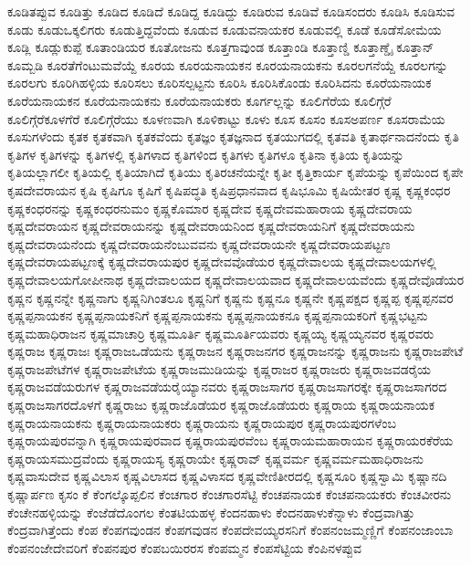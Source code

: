 {ಕೂಡಿತಪ್ಪುವ
ಕೂಡಿತ್ತು
ಕೂಡಿದ
ಕೂಡಿದೆ
ಕೂಡಿದ್ದ
ಕೂಡಿದ್ದು
ಕೂಡಿರುವ
ಕೂಡಿವೆ
ಕೂಡಿಸಂದರು
ಕೂಡಿಸಿ
ಕೂಡಿಸುವ
ಕೂಡು
ಕೂಡುಒಕ್ಕಲಿಗರು
ಕೂಡುತ್ತಿದ್ದವೆಂದು
ಕೂಡುವ
ಕೂಡುವನಾಯಕರ
ಕೂಡುವಲ್ಲಿ
ಕೂಡೆ
ಕೂಡೆಸೋಮೆಯ
ಕೂಡ್ಲಿ
ಕೂಡ್ಲುಕುಪ್ಪೆ
ಕೂತಾಂಡಿಯರ
ಕೂತೋಜನು
ಕೂತ್ತಗಾವುಂಡ
ಕೂತ್ತಾಂಡಿ
ಕೂತ್ತಾಣ್ಡಿ
ಕೂತ್ತಾಣ್ಡೈ
ಕೂತ್ತಾನ್
ಕೂಮ್ಬಡಿ
ಕೂರತೆಗೆಂಟುಮವೆಯ್ದೆ
ಕೂರಯ
ಕೂರಯನಾಯಕನ
ಕೂರಯನಾಯಕನು
ಕೂರಲಗನೆಯ್ದೆ
ಕೂರಲಗನ್ನು
ಕೂರಲಗು
ಕೂರಿಗಿಹಳ್ಳಿಯ
ಕೂರಿಸಲು
ಕೂರಿಸಲ್ಪಟ್ಟನು
ಕೂರಿಸಿ
ಕೂರಿಸಿಕೊಂಡು
ಕೂರಿಸಿದನು
ಕೂರೆಯನಾಯಕ
ಕೂರೆಯನಾಯಕನ
ಕೂರೆಯನಾಯಕನು
ಕೂರೆಯನಾಯಕರು
ಕೂರ್ಗಲ್ಲನ್ನು
ಕೂಲಿಗೆರೆಯ
ಕೂಲಿಗ್ಗೆರೆ
ಕೂಲಿಗ್ಗೆರೆಕೂಳಗೆರೆ
ಕೂಲಿಗ್ಗೆರೆಯು
ಕೂಳಣವಾಗಿ
ಕೂಳಿಕಾಟ್ಟು
ಕೂಳು
ಕೂಸ
ಕೂಸಂ
ಕೂಸಅಪರ್ಣ
ಕೂಸರಾಮೆಯ
ಕೂಸುಗಳೆಂದು
ಕೃತಕ
ಕೃತಕವಾಗಿ
ಕೃತಕವೆಂದು
ಕೃತಜ್ಞಂ
ಕೃತಜ್ಞನಾದ
ಕೃತಯುಗದಲ್ಲಿ
ಕೃತವತಿ
ಕೃತಾರ್ಥನಾದನೆಂದು
ಕೃತಿ
ಕೃತಿಗಳ
ಕೃತಿಗಳನ್ನು
ಕೃತಿಗಳಲ್ಲಿ
ಕೃತಿಗಳಾದ
ಕೃತಿಗಳಿಂದ
ಕೃತಿಗಳು
ಕೃತಿಗಳೂ
ಕೃತಿನಾ
ಕೃತಿಯ
ಕೃತಿಯನ್ನು
ಕೃತಿಯಲ್ಲಾಗಲೀ
ಕೃತಿಯಲ್ಲಿ
ಕೃತಿಯಾಗಿದೆ
ಕೃತಿಯು
ಕೃತಿರಚನೆಯನ್ನೇ
ಕೃತೀ
ಕೃತ್ತಿಕಾರ್ಯ
ಕೃಪೆಯನ್ನು
ಕೃಪೆಯಿಂದ
ಕೃಪೇ
ಕೃಷದೇವರಾಯನ
ಕೃಷಿ
ಕೃಷಿಗೂ
ಕೃಷಿಗೆ
ಕೃಷಿಪದ್ಧತಿ
ಕೃಷಿಪ್ರಧಾನವಾದ
ಕೃಷಿಭೂಮಿ
ಕೃಷಿಯೇತರ
ಕೃಷ್ಣ
ಕೃಷ್ಣಕಂಧರ
ಕೃಷ್ಣಕಂಧರನನ್ನು
ಕೃಷ್ಣಕಂಧರನುಮಂ
ಕೃಷ್ಣಕೊಮಾರ
ಕೃಷ್ಣದೇವ
ಕೃಷ್ಣದೇವಮಹಾರಾಯ
ಕೃಷ್ಣದೇವರಾಯ
ಕೃಷ್ಣದೇವರಾಯನ
ಕೃಷ್ಣದೇವರಾಯನನ್ನು
ಕೃಷ್ಣದೇವರಾಯನಿಂದ
ಕೃಷ್ಣದೇವರಾಯನಿಗೆ
ಕೃಷ್ಣದೇವರಾಯನು
ಕೃಷ್ಣದೇವರಾಯನೆಂದು
ಕೃಷ್ಣದೇವರಾಯನೆಂಬುವವನು
ಕೃಷ್ಣದೇವರಾಯನೇ
ಕೃಷ್ಣದೇವರಾಯಪಟ್ಟಣ
ಕೃಷ್ಣದೇವರಾಯಪಟ್ಟಣಕ್ಕೆ
ಕೃಷ್ಣದೇವರಾಯಪುರ
ಕೃಷ್ಣದೇವವೊಡೆಯರ
ಕೃಷ್ಣದೇವಾಲಯ
ಕೃಷ್ಣದೇವಾಲಯಗಳಲ್ಲಿ
ಕೃಷ್ಣದೇವಾಲಯಗೋಪೀನಾಥ
ಕೃಷ್ಣದೇವಾಲಯದ
ಕೃಷ್ಣದೇವಾಲಯವಾದ
ಕೃಷ್ಣದೇವಾಲಯವೆಂದು
ಕೃಷ್ಣದೇವೊಡೆಯರ
ಕೃಷ್ಣನ
ಕೃಷ್ಣನನ್ನೇ
ಕೃಷ್ಣನಾಗು
ಕೃಷ್ಣನಿಗಿಂತಲೂ
ಕೃಷ್ಣನಿಗೆ
ಕೃಷ್ಣನು
ಕೃಷ್ಣನೂ
ಕೃಷ್ಣನೇ
ಕೃಷ್ಣಪಕ್ಷದ
ಕೃಷ್ಣಪ್ಪ
ಕೃಷ್ಣಪ್ಪನವರ
ಕೃಷ್ಣಪ್ಪನಾಯಕನ
ಕೃಷ್ಣಪ್ಪನಾಯಕನಿಗೆ
ಕೃಷ್ಣಪ್ಪನಾಯಕನು
ಕೃಷ್ಣಪ್ಪನಾಯಕನೂ
ಕೃಷ್ಣಪ್ಪನಾಯಕರಿಗೆ
ಕೃಷ್ಣಭಟ್ಟನು
ಕೃಷ್ಣಮಹಾಧಿರಾಜನ
ಕೃಷ್ಣಮಾಚಾರ್ರಿ
ಕೃಷ್ಣಮೂರ್ತಿ
ಕೃಷ್ಣಮೂರ್ತಿಯವರು
ಕೃಷ್ಣಯ್ಯ
ಕೃಷ್ಣಯ್ಯನವರ
ಕೃಷ್ಣರವರು
ಕೃಷ್ಣರಾಜ
ಕೃಷ್ಣರಾಜಃ
ಕೃಷ್ಣರಾಜಒಡೆಯನು
ಕೃಷ್ಣರಾಜನ
ಕೃಷ್ಣರಾಜನಗರ
ಕೃಷ್ಣರಾಜನನ್ನು
ಕೃಷ್ಣರಾಜನು
ಕೃಷ್ಣರಾಜಪೇಟೆ
ಕೃಷ್ಣರಾಜಪೇಟೆಗಳ
ಕೃಷ್ಣರಾಜಪೇಟೆಯ
ಕೃಷ್ಣರಾಜಮುಡಿಯನ್ನು
ಕೃಷ್ಣರಾಜರ
ಕೃಷ್ಣರಾಜರು
ಕೃಷ್ಣರಾಜವಡರೈಯ
ಕೃಷ್ಣರಾಜವಡೆಯರುಗಳ
ಕೃಷ್ಣರಾಜವಡೆಯರೈಯ್ಯಾನವರು
ಕೃಷ್ಣರಾಜಸಾಗರ
ಕೃಷ್ಣರಾಜಸಾಗರಕ್ಕೇ
ಕೃಷ್ಣರಾಜಸಾಗರದ
ಕೃಷ್ಣರಾಜಸಾಗರದೊಳಗೆ
ಕೃಷ್ಣರಾಜು
ಕೃಷ್ಣರಾಜೊಡೆಯರ
ಕೃಷ್ಣರಾಜೊಡೆಯರು
ಕೃಷ್ಣರಾಯ
ಕೃಷ್ಣರಾಯನಾಯಕ
ಕೃಷ್ಣರಾಯನಾಯಕನು
ಕೃಷ್ಣರಾಯನಾಯಕರು
ಕೃಷ್ಣರಾಯನು
ಕೃಷ್ಣರಾಯಪುರ
ಕೃಷ್ಣರಾಯಪುರಗಳೆಂಬ
ಕೃಷ್ಣರಾಯಪುರವನ್ನಾಗಿ
ಕೃಷ್ಣರಾಯಪುರವಾದ
ಕೃಷ್ಣರಾಯಪುರವೆಂಬ
ಕೃಷ್ಣರಾಯಮಹಾರಾಯನ
ಕೃಷ್ಣರಾಯರಕೆರೆಯ
ಕೃಷ್ಣರಾಯಸಮುದ್ರವೆಂದು
ಕೃಷ್ಣರಾಯಸ್ಯ
ಕೃಷ್ಣರಾಯೇ
ಕೃಷ್ಣರಾವ್
ಕೃಷ್ಣವರ್ಮ
ಕೃಷ್ಣವರ್ಮಮಹಾಧಿರಾಜನು
ಕೃಷ್ಣವಾಸುದೇವ
ಕೃಷ್ಣವಿಲಾಸ
ಕೃಷ್ಣವಿಲಾಸದ
ಕೃಷ್ಣವಿಳಾಸದ
ಕೃಷ್ಣವೇಣಿತೀರದಲ್ಲಿ
ಕೃಷ್ಣಸೂರಿ
ಕೃಷ್ಣಸ್ವಾಮಿ
ಕೃಷ್ಣಾನದಿ
ಕೃಷ್ಣಾರ್ಪಣ
ಕೃಸಂ
ಕೆ
ಕೆಂಗಲ್ಕೊಪ್ಪಲಿನ
ಕೆಂಚಗಾರ
ಕೆಂಚಗಾರಸೆಟ್ಟಿ
ಕೆಂಚಪನಾಯಕ
ಕೆಂಚಪನಾಯಕರು
ಕೆಂಚವೀರನು
ಕೆಂಚೇನಹಳ್ಳಿಯನ್ನು
ಕೆಂಜೆಡೆದೊಂಗಲ
ಕೆಂತಟಿಯಹಳ್ಳ
ಕೆಂದನಹಾಳು
ಕೆಂದನಹಾಳುಕೆನ್ನಾಳು
ಕೆಂದ್ರವಾಗಿತ್ತು
ಕೆಂದ್ರವಾಗಿತ್ತೆಂದು
ಕೆಂಪ
ಕೆಂಪಗವುಂಡನ
ಕೆಂಪಗವುಡನ
ಕೆಂಪದೇವಯ್ಯರಸನಿಗೆ
ಕೆಂಪನಂಜಮ್ಮಣ್ಣಿಗೆ
ಕೆಂಪನಂಜಾಂಬಾ
ಕೆಂಪನಂಜೇದೇವರಿಗೆ
ಕೆಂಪನಪುರ
ಕೆಂಪಬಯಿರರಸ
ಕೆಂಪಮ್ಮನ
ಕೆಂಪಸೆಟ್ಟಿಯ
ಕೆಂಪಿನಳಪ್ಪುವ
}
